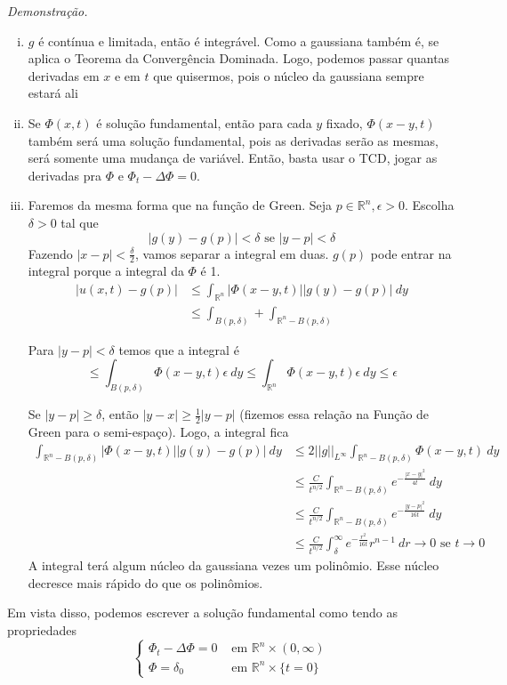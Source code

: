\documentclass[11pt]{article}
\newcommand{\Rn}{{\mathbb{R}^n}}
\newcommand{\e}{\epsilon}
\newcommand{\norm}[2]{\left|\left|#1\right|\right|_{L^{#2}}}
\begin{document}
\textit{Demonstração.}\begin{enumerate}[(i)]
	\item \(g\) é contínua e limitada, então é integrável. Como a gaussiana também é, se aplica o Teorema da Convergência Dominada. Logo, podemos passar quantas derivadas em \(x\) e em \(t\) que quisermos, pois o núcleo da gaussiana sempre estará ali
	\item Se \(\Phi(x,t)\) é solução fundamental, então para cada \(y\) fixado, \(\Phi(x-y,t)\) também será uma solução fundamental, pois as derivadas serão as mesmas, será somente uma mudança de variável. Então, basta usar o TCD, jogar as derivadas pra \(\Phi\) e \(\Phi_t - \Delta\Phi =0 \).
	\item Faremos da mesma forma que na função de Green. Seja \(p \in \Rn, \e>0\). Escolha \(\delta>0\) tal que \[|g(y) - g(p)| < \delta \text{ se } |y-p| < \delta\] Fazendo \(|x-p|<\frac{\delta}{2}\), vamos separar a integral em duas. \(g(p)\) pode entrar na integral porque a integral da \(\Phi\) é 1. \begin{align*}
		|u(x,t) - g(p)| &\leq \int_\Rn |\Phi(x-y,t) || g(y) - g(p)| \ dy  \\
		&\leq \int_{B(p,\delta)} +  \int_{\Rn - B(p,\delta)}
	\end{align*}

	Para \(|y-p|<\delta\) temos que a integral é \[\leq \int_{B(p,\delta)} \Phi(x-y,t) \epsilon\ dy \leq  \int_{\Rn} \Phi(x-y,t) \epsilon\ dy \leq \e\]
	
	Se \(|y-p|\geq\delta\), então \(|y-x|\geq \frac{1}{2}|y-p|\) (fizemos essa relação na Função de Green para o semi-espaço). Logo, a integral fica \begin{align*}
		\int_{\Rn - B(p,\delta)} |\Phi(x-y,t) || g(y) - g(p)| \ dy &\leq 2\norm{g}{\infty} \int_{\Rn - B(p,\delta)} \Phi(x-y,t)\ dy  \\
		&\leq \frac{C}{t^{n/2}} \int_{\Rn - B(p,\delta)} e^{-\frac{|x-y|^2}{4t}}\ dy \\
		&\leq \frac{C}{t^{n/2}} \int_{\Rn - B(p,\delta)} e^{-\frac{|y-p|^2}{16t}}\ dy \\
		&\leq \frac{C}{t^{n/2}} \int_\delta^\infty e^{-\frac{r^2}{16t}} r^{n-1}\ dr \rightarrow 0 \text{ se } t \rightarrow 0 
	\end{align*}
A integral terá algum núcleo da gaussiana vezes um polinômio. Esse núcleo decresce mais rápido do que os polinômios.

\end{enumerate}

	Em vista disso, podemos escrever a solução fundamental como tendo as propriedades \[\begin{cases}
		\Phi_t - \Delta\Phi =0 &\text{ em } \Rn \times (0,\infty)\\
		\Phi = \delta_0 &\text{ em } \Rn \times \{t=0\}
	\end{cases}\]
\end{document}
